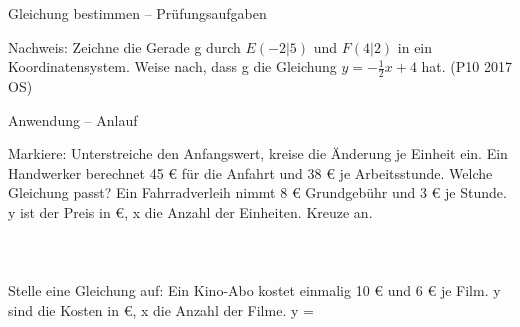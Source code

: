 \begin{aufgabe}{Gleichung bestimmen – Prüfungsaufgaben}
\begin{teile}
\begin{ksys}[xmin=-4,xmax=4,ymin=-5,ymax=4] \end{ksys}
\teil Nachweis: Zeichne die Gerade g durch $E(-2|5)$ und $F(4|2)$ in ein Koordinatensystem. Weise nach, dass g die Gleichung $y = -\frac{1}{2}x + 4$ hat. \hfill (P10 2017 OS)

\begin{ksys}[xmin=-4,xmax=5,ymin=-4,ymax=6] \end{ksys}
\end{teile}
\end{aufgabe}

\begin{aufgabe}{Anwendung – Anlauf}
\begin{teile}
\teil Markiere: Unterstreiche den Anfangswert, kreise die Änderung je Einheit ein. Ein Handwerker berechnet 45 € für die Anfahrt und 38 € je Arbeitsstunde.
\teil Welche Gleichung passt? Ein Fahrradverleih nimmt 8 € Grundgebühr und 3 € je Stunde. y ist der Preis in €, x die Anzahl der Einheiten. Kreuze an. \\  \\  \\  \\ 
\teil Stelle eine Gleichung auf: Ein Kino-Abo kostet einmalig 10 € und 6 € je Film. y sind die Kosten in €, x die Anzahl der Filme. y = \leerfeld
\end{teile}
\end{aufgabe}

